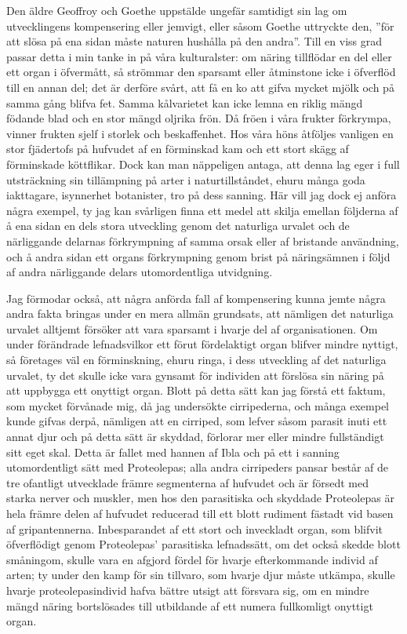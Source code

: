 Den äldre Geoffroy och Goethe uppstälde ungefär samtidigt sin lag om utvecklingens kompensering eller jemvigt, eller såsom Goethe uttryckte den, ”för att slösa på ena sidan måste naturen hushålla på den andra”. Till en viss grad passar detta i min tanke in på våra kulturalster: om näring tillflödar en del eller ett organ i öfvermått, så strömmar den sparsamt eller åtminstone icke i öfverflöd till en annan del; det är derföre svårt, att få en ko att gifva mycket mjölk och på samma gång blifva fet. Samma kålvarietet kan icke lemna en riklig mängd födande blad och en stor mängd oljrika frön. Då fröen i våra frukter förkrympa, vinner frukten sjelf i storlek och beskaffenhet. Hos våra höns åtföljes vanligen en stor fjädertofs på hufvudet af en förminskad kam och ett stort skägg af förminskade köttflikar. Dock kan man näppeligen antaga, att denna lag eger i full utsträckning sin tillämpning på arter i naturtillståndet, ehuru många goda iakttagare, isynnerhet botanister, tro på dess sanning. Här vill jag dock ej anföra några exempel, ty jag kan svårligen finna ett medel att skilja emellan följderna af å ena sidan en dels stora utveckling genom det naturliga urvalet och de närliggande delarnas förkrympning af samma orsak eller af bristande användning, och å andra sidan ett organs förkrympning genom brist på näringsämnen i följd af andra närliggande delars utomordentliga utvidgning.

Jag förmodar också, att några anförda fall af kompensering kunna jemte några andra fakta bringas under en mera allmän grundsats, att nämligen det naturliga urvalet alltjemt försöker att vara sparsamt i hvarje del af organisationen. Om under förändrade lefnadsvilkor ett förut fördelaktigt organ blifver mindre nyttigt, så företages väl en förminskning, ehuru ringa, i dess utveckling af det naturliga urvalet, ty det skulle icke vara gynsamt för individen att förslösa sin näring på att uppbygga ett onyttigt organ. Blott på detta sätt kan jag förstå ett faktum, som mycket förvånade mig, då jag undersökte cirripederna, och många exempel kunde gifvas derpå, nämligen att en cirriped, som lefver såsom parasit inuti ett annat djur och på detta sätt är skyddad, förlorar mer eller mindre fullständigt sitt eget skal. Detta är fallet med hannen af Ibla och på ett i sanning utomordentligt sätt med Proteolepas; alla andra cirripeders pansar består af de tre ofantligt utvecklade främre segmenterna af hufvudet och är försedt med starka nerver och muskler, men hos den parasitiska och skyddade Proteolepas är hela främre delen af hufvudet reducerad till ett blott rudiment fästadt vid basen af gripantennerna. Inbesparandet af ett stort och inveckladt organ, som blifvit öfverflödigt genom Proteolepas’ parasitiska lefnadssätt, om det också skedde blott småningom, skulle vara en afgjord fördel för hvarje efterkommande individ af arten; ty under den kamp för sin tillvaro, som hvarje djur måste utkämpa, skulle hvarje proteolepasindivid hafva bättre utsigt att försvara sig, om en mindre mängd näring bortslösades till utbildande af ett numera fullkomligt onyttigt organ.

